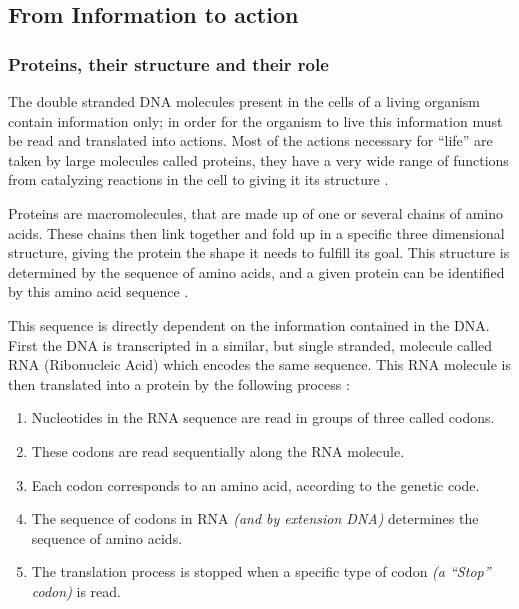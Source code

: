 \documentclass[
  11pt,
  twoside]{scrbook}
\providecommand{\tightlist}{%
  \setlength{\itemsep}{0pt}\setlength{\parskip}{0pt}}
\begin{document}
\hypertarget{from-information-to-action}{%
\subsection{From Information to action}\label{from-information-to-action}}

\hypertarget{proteins-their-structure-and-their-role}{%
\subsubsection{Proteins, their structure and their role}\label{proteins-their-structure-and-their-role}}

The double stranded DNA molecules present in the cells of a living organism contain information only; in order for the organism to live this information must be read and translated into actions. Most of the actions necessary for ``life'' are taken by large molecules called proteins, they have a very wide range of functions from catalyzing reactions in the cell to giving it its structure \autocite{alberts2002}.

Proteins are macromolecules, that are made up of one or several chains of amino acids. These chains then link together and fold up in a specific three dimensional structure, giving the protein the shape it needs to fulfill its goal. This structure is determined by the sequence of amino acids, and a given protein can be identified by this amino acid sequence \autocite{alberts2002}.

This sequence is directly dependent on the information contained in the DNA. First the DNA is transcripted in a similar, but single stranded, molecule called RNA (Ribonucleic Acid) which encodes the same sequence. This RNA molecule is then translated into a protein by the following process \autocite{crick1961}:

\begin{enumerate}
\def\labelenumi{\arabic{enumi}.}
\tightlist
\item
  Nucleotides in the RNA sequence are read in groups of three called codons.
\item
  These codons are read sequentially along the RNA molecule.
\item
  Each codon corresponds to an amino acid, according to the genetic code.
\item
  The sequence of codons in RNA \emph{(and by extension DNA)} determines the sequence of amino acids.
\item
  The translation process is stopped when a specific type of codon \emph{(a ``Stop'' codon)} is read.
\end{enumerate}
\end{document}
